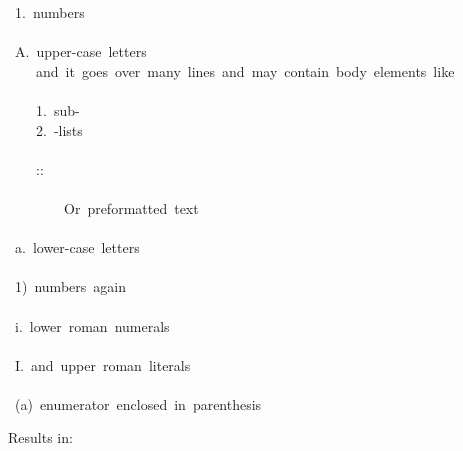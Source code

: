 \documentclass[12pt]{article}
\begin{document}
\begin{ttfamily}\begin{flushleft}
\mbox{~1.~numbers}\\
\mbox{}\\
\mbox{~A.~upper-case~letters}\\
\mbox{~~~~and~it~goes~over~many~lines~and~may~contain~body~elements~like}\\
\mbox{}\\
\mbox{~~~~1.~sub-}\\
\mbox{~~~~2.~-lists}\\
\mbox{}\\
\mbox{~~~~::}\\
\mbox{}\\
\mbox{~~~~~~~~Or~preformatted~text}\\
\mbox{}\\
\mbox{~a.~lower-case~letters}\\
\mbox{}\\
\mbox{~1)~numbers~again}\\
\mbox{}\\
\mbox{~i.~lower~roman~numerals}\\
\mbox{}\\
\mbox{~I.~and~upper~roman~literals}\\
\mbox{}\\
\mbox{~(a)~enumerator~enclosed~in~parenthesis}\\
\end{flushleft}\end{ttfamily}

Results in:
\end{document}
